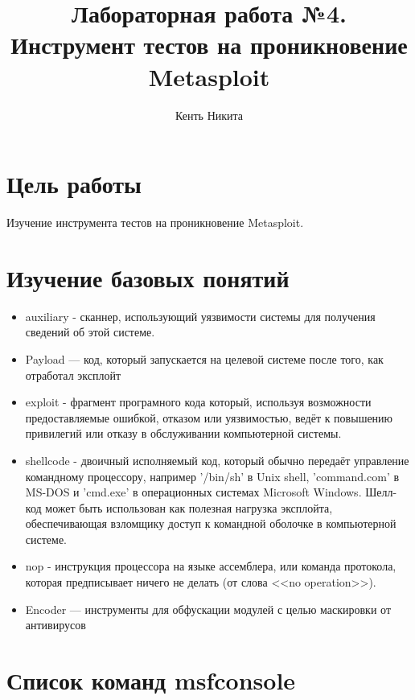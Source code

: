 \documentclass[10pt,a4paper]{report}
\author{Кенть Никита}
\title{Лабораторная работа №4.\\
	Инструмент тестов на проникновение Metasploit}
\begin{document}
	\maketitle
	\renewcommand{\thesection}{\arabic{section}}
	\tableofcontents
	\pagebreak
	
	\setcounter{totalnumber}{10}
	\setcounter{topnumber}{10}
	\setcounter{bottomnumber}{10}
	\renewcommand{\topfraction}{1}
	\renewcommand{\textfraction}{0}
	
	\section{Цель работы}
		Изучение инструмента тестов на проникновение Metasploit.
	\section{Изучение базовых понятий}
		\begin{itemize}
			\item auxiliary - сканнер, использующий уязвимости системы для получения 
			сведений об этой системе.%
			\item Payload — код, который запускается на целевой системе после того, как отработал эксплойт
			\item exploit - фрагмент програмного кода который, используя
			возможности предоставляемые ошибкой, отказом или уязвимостью, ведёт к
			повышению привилегий или отказу в обслуживании компьютерной системы.
			\item shellcode - двоичный исполняемый код, который обычно передаёт 
			управление командному процессору, например '/bin/sh' в Unix shell, 
			'command.com' в MS-DOS и 'cmd.exe' в операционных системах Microsoft 
			Windows. Шелл-код может быть использован как полезная нагрузка эксплойта, 
			обеспечивающая взломщику доступ к командной оболочке в компьютерной 
			системе.
			\item nop - инструкция процессора на языке ассемблера, или команда 
			протокола, которая предписывает ничего не делать (от слова <<no 
			operation>>).
			\item Encoder — инструменты для обфускации модулей с целью маскировки от антивирусов
		\end{itemize}
		
		\section{Список команд msfconsole}
		
\end{document}
